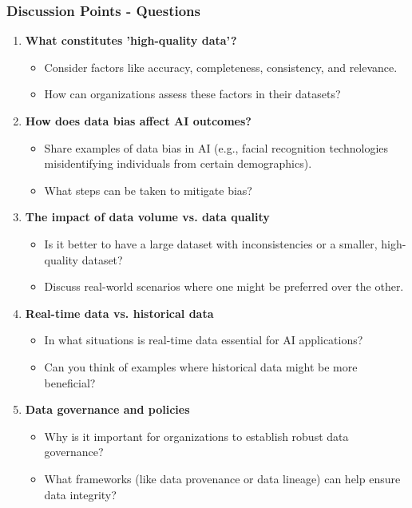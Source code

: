 \documentclass[aspectratio=169]{beamer}
\begin{document}
\begin{frame}[fragile]
    \frametitle{Discussion Points - Questions}
    \begin{enumerate}
        \item \textbf{What constitutes 'high-quality data'?}
        \begin{itemize}
            \item Consider factors like accuracy, completeness, consistency, and relevance.
            \item How can organizations assess these factors in their datasets?
        \end{itemize}

        \item \textbf{How does data bias affect AI outcomes?}
        \begin{itemize}
            \item Share examples of data bias in AI (e.g., facial recognition technologies misidentifying individuals from certain demographics).
            \item What steps can be taken to mitigate bias?
        \end{itemize}
        
        \item \textbf{The impact of data volume vs. data quality}
        \begin{itemize}
            \item Is it better to have a large dataset with inconsistencies or a smaller, high-quality dataset?
            \item Discuss real-world scenarios where one might be preferred over the other.
        \end{itemize}
        
        \item \textbf{Real-time data vs. historical data}
        \begin{itemize}
            \item In what situations is real-time data essential for AI applications?
            \item Can you think of examples where historical data might be more beneficial?
        \end{itemize}
        
        \item \textbf{Data governance and policies}
        \begin{itemize}
            \item Why is it important for organizations to establish robust data governance?
            \item What frameworks (like data provenance or data lineage) can help ensure data integrity?
        \end{itemize}
    \end{enumerate}    
\end{frame}
\end{document}
